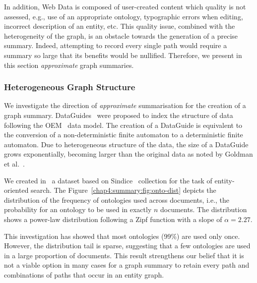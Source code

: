 In addition, Web Data is composed of user-created content which quality is not assessed, e.g., use of an appropriate ontology, typographic errors when editing, incorrect description of an entity, etc. This quality issue, combined with the heterogeneity of the graph, is an obstacle towards the generation of a precise summary. Indeed, attempting to record every single path would require a summary so large that its benefits would be nullified. Therefore, we present in this section \emph{approximate} graph summaries.

\subsubsection{Heterogeneous Graph Structure}

We investigate the direction of \emph{approximate} summarisation for the creation of a graph summary. DataGuides~\cite{goldman1997dataguides} were proposed to index the structure of data following the OEM~\cite{papakonstantinou:1995:oea} data model.
The creation of a DataGuide is equivalent to the conversion of a non-deterministic finite automaton to a deterministic finite automaton.
Due to heterogeneous structure of the data, the size of a DataGuide grows exponentially, becoming larger than the original data as noted by Goldman et al.~\cite{goldman1999approximate}.

We created in~\cite{campinas:2011:eos} a dataset based on Sindice~\cite{oren:2008:sdl} collection for the task of entity-oriented search. The Figure~\ref{chap4:summary:fig:onto-dist} depicts the distribution of the frequency of ontologies used across documents, i.e., the probability for an ontology to be used in exactly $n$ documents. The distribution shows a power-law distribution following a Zipf function with a slope of $\alpha = 2.27$.

This investigation has showed that most ontologies (99\%) are used only once. However, the distribution tail is sparse, suggesting that a few ontologies are used in a large proportion of documents.
This result strengthens our belief that it is not a viable option in many cases for a graph summary to retain every path and combinations of paths that occur in an entity graph.

